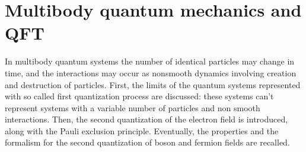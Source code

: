 \documentclass[letterpaper,10pt,english]{jupyterBook}
\begin{document}
\section{Multi\sphinxhyphen{}body quantum mechanics and QFT}
\label{\detokenize{ch/quantum-mechanics/qft/multi-body:multi-body-quantum-mechanics-and-qft}}\label{\detokenize{ch/quantum-mechanics/qft/multi-body:quantum-mechanics-qft-multi-body}}\label{\detokenize{ch/quantum-mechanics/qft/multi-body::doc}}
\sphinxAtStartPar
In multi\sphinxhyphen{}body quantum systems the number of identical particles may change in time, and the interactions may occur as non\sphinxhyphen{}smooth dynamics involving creation and destruction of particles. First, the limits of the quantum systems represented with so called first quantization process are discussed: these systems can’t represent systems with a variable number of particles and non smooth interactions. Then, the second quantization of the electron field is introduced, along with the Pauli exclusion principle. Eventually, the properties and the formalism for the second quantization of boson and fermion fields are recalled.
\end{document}
